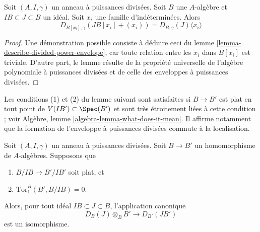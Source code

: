 \begin{lemma}
\label{lemma-divided-power-envelope-add-variables}
Soit $(A, I, \gamma)$ un anneau à puissances divisées.
Soit $B$ une $A$-algèbre et $IB \subset J \subset B$ un idéal.
Soit $x_i$ une famille d'indéterminées. Alors
$$
D_{B[x_i], \gamma}(JB[x_i] + (x_i)) = D_{B, \gamma}(J) \langle x_i \rangle
$$
\end{lemma}

\begin{proof}
Une démonstration possible consiste à déduire ceci du
lemme \ref{lemma-describe-divided-power-envelope},
car toute relation entre les $x_i$ dans $B[x_i]$ est triviale.
D'autre part, le lemme résulte de la propriété universelle
de l'algèbre polynomiale à puissances divisées et de celle des
enveloppes à puissances divisées.
\end{proof}

\noindent
Les conditions (1) et (2) du lemme suivant sont satisfaites si $B \to B'$ est plat
en tout point de $V(IB') \subset \Spec(B')$ et sont très étroitement liées
à cette condition ; voir
Algèbre, lemme \ref{algebra-lemma-what-does-it-mean}.
Il affirme notamment que la formation de l'enveloppe à
puissances divisées commute à la localisation.

\begin{lemma}
\label{lemma-flat-base-change-divided-power-envelope}
Soit $(A, I, \gamma)$ un anneau à puissances divisées.
Soit $B \to B'$ un homomorphisme de $A$-algèbres.
Supposons que
\begin{enumerate}
\item $B/IB \to B'/IB'$ soit plat, et
\item $\text{Tor}_1^B(B', B/IB) = 0$.
\end{enumerate}
Alors, pour tout idéal $IB \subset J \subset B$, l'application canonique
$$
D_B(J) \otimes_B B' \longrightarrow D_{B'}(JB')
$$
est un isomorphisme.
\end{lemma}

